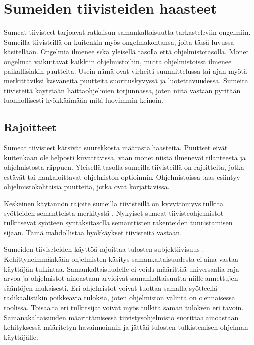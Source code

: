 \chapter{Sumeiden tiivisteiden haasteet\label{fuzzy-problems}}

Sumeat tiivisteet tarjoavat ratkaisun
samankaltaisuutta tarkasteleviin ongelmiin.
Sumeilla tiivisteillä on kuitenkin myös ongelmakohtansa,
joita tässä luvussa käsitellään. Ongelmia ilmenee
sekä yleisellä tasolla että ohjelmistotasolla. Monet
ongelmat vaikuttavat kaikkiin ohjelmistoihin,
mutta ohjelmistoissa ilmenee paikallisiakin puutteita.
Usein nämä ovat virheitä suunnittelussa tai ajan
myötä merkittäviksi kasvaneita puutteita
suorituskyvyssä ja luotettavuudessa.
Sumeita tiivisteitä käytetään haittaohjelmien
torjunnassa, joten niitä vastaan pyritään
luonnollisesti hyökkäämään mitä luovimmin keinoin.


\section{Rajoitteet}

Sumeat tiivisteet kärsivät suurehkosta määrästä haasteita.
Puutteet eivät kuitenkaan ole helposti kuvattavissa,
vaan monet niistä ilmenevät tilanteesta ja ohjelmistosta
riippuen. Yleisellä tasolla sumeilla tiivisteillä
on rajoitteita, jotka estävät tai hankaloittavat
ohjelmiston optioinnin. Ohjelmistoissa taas
esiintyy ohjelmistokohtaisia puutteita, jotka
ovat korjattavissa.

Keskeinen käytännön rajoite sumeilla tiivisteillä on kyvyttömyys
tulkita syötteiden semantteista merkitystä \textcite{li15}. Nykyiset
sumeat tiivisteohjelmistot tulkitsevat syötteen syntaksitasolla
semanttisten rakenteiden tunnistamisen sijaan. Tämä
mahdollistaa hyökkäykset tiivisteitä vastaan.

Sumeiden tiiviseteiden käyttöä rajoittaa tulosten subjektiivisuus \citep{naik19}.
Kehittyneimmänkään ohjelmiston käsitys samankaltaisuudesta
ei aina vastaa käyttäjän tulkintaa. Samankaltaisuudelle ei voida
määrittää universaalia raja-arvoa ja ohjelmistot ainoastaan
arvioivat samankaltaisuutta niille annettujen sääntöjen mukaisesti.
Eri ohjelmistot voivat tuottaa samalla syötteellä radikaalistikin
poikkeavia tuloksia, joten ohjelmiston valinta on olennaisessa
roolissa. Toisaalta eri tulkitsijat voivat myös tulkita saman
tuloksen eri tavoin. Samanakaltaisuuden määrittämisessä
tiivistysohjelmisto suorittaa ainoastaan kehityksessä
määritetyn havainnoinnin ja jättää tulosten
tulkistemisen ohjelman käyttäjälle.

